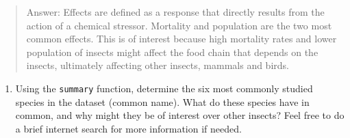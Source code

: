 \documentclass[
]{article}
\newenvironment{Shaded}{\begin{snugshade}}{\end{snugshade}}
\newcommand{\KeywordTok}[1]{\textcolor[rgb]{0.13,0.29,0.53}{\textbf{#1}}}
\newcommand{\NormalTok}[1]{#1}
\newcommand{\OperatorTok}[1]{\textcolor[rgb]{0.81,0.36,0.00}{\textbf{#1}}}
\providecommand{\tightlist}{%
  \setlength{\itemsep}{0pt}\setlength{\parskip}{0pt}}
\begin{document}
\begin{quote}
Answer: Effects are defined as a response that directly results from the
action of a chemical stressor. Mortality and population are the two most
common effects. This is of interest because high mortality rates and
lower population of insects might affect the food chain that depends on
the insects, ultimately affecting other insects, mammals and birds.
\end{quote}

\begin{enumerate}
\def\labelenumi{\arabic{enumi}.}
\setcounter{enumi}{6}
\tightlist
\item
  Using the \texttt{summary} function, determine the six most commonly
  studied species in the dataset (common name). What do these species
  have in common, and why might they be of interest over other insects?
  Feel free to do a brief internet search for more information if
  needed.
\end{enumerate}

\begin{Shaded}
\end{Shaded}
\end{document}
